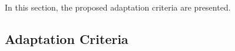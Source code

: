 In this section, the proposed adaptation criteria are presented. 
\subsection{Adaptation Criteria}

